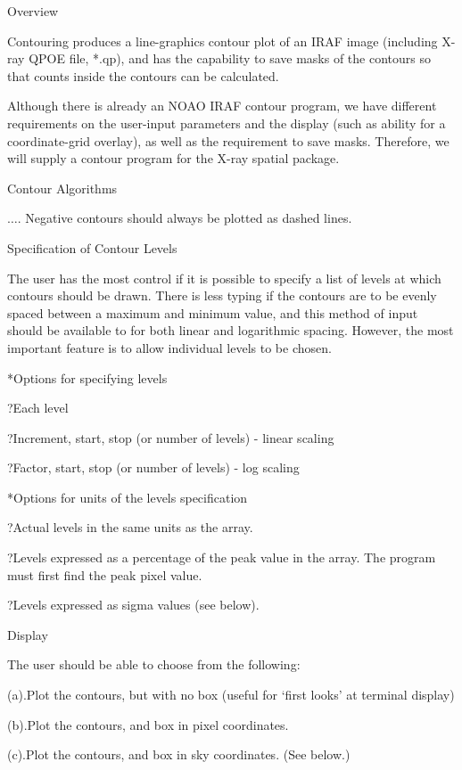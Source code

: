 %
\def\version{Version 1.4 --- 1/18/90}
\def\chapter{Spatial --- Contouring (dmw)}
\@{Overview}

Contouring produces a line-graphics contour plot of an IRAF image (including X-ray
QPOE file, *.qp), and has the capability to
save masks of the contours so that counts inside the contours can be calculated.

Although there is already an NOAO IRAF contour program, 
we have different requirements on the user-input parameters
and the display (such as ability for a coordinate-grid overlay), as
well as the requirement to save masks.  Therefore,
we will supply a contour program for the X-ray spatial package.

\@{Contour Algorithms}

$\ldots$.
Negative contours should always be plotted as dashed lines.

\@{Specification of Contour Levels}

The user has the most control if it is possible to specify a list of
levels at which contours should be drawn.  There is less typing if the
contours are to be evenly spaced between a maximum and minimum value,
and this method of input should be available to for
both linear and logarithmic spacing.
However, the most important feature is to allow individual levels to
be chosen.

\**Options for specifying levels

\??Each level

\??Increment, start, stop (or number of levels) - linear scaling

\??Factor, start, stop (or number of levels) - log scaling

\**Options for units of the levels specification

\??Actual levels in the same units as the array.

\??Levels expressed as a percentage of the peak value in the array.
The program must first find the peak pixel value.

\??Levels expressed as sigma values (see below).


\@{Display}

The user should be able to choose from the following:
\item{(a).}Plot the contours, but with no box  (useful for `first
looks' at terminal display)
\item{(b).}Plot the contours, and box in pixel coordinates.
\item{(c).}Plot the contours, and box in sky coordinates.  (See below.)


